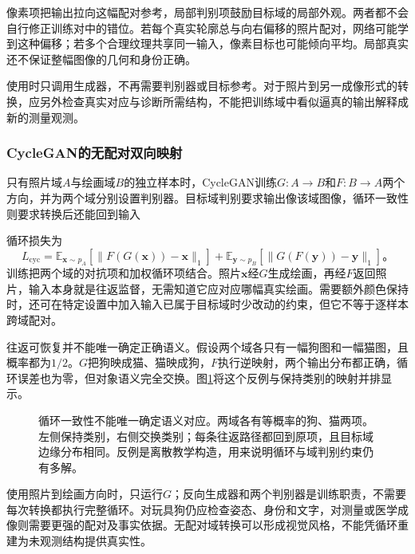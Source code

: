 像素项把输出拉向这幅配对参考，局部判别项鼓励目标域的局部外观。两者都不会自行修正训练对中的错位。若每个真实轮廓总与向右偏移的照片配对，网络可能学到这种偏移；若多个合理纹理共享同一输入，像素目标也可能倾向平均。局部真实还不保证整幅图像的几何和身份正确。

使用时只调用生成器，不再需要判别器或目标参考。对于照片到另一成像形式的转换，应另外检查真实对应与诊断所需结构，不能把训练域中看似逼真的输出解释成新的测量观测。

\subsubsection{CycleGAN的无配对双向映射}
\label{sec:vision-generation-cyclegan}

只有照片域$A$与绘画域$B$的独立样本时，CycleGAN训练$G:A\to B$和$F:B\to A$两个方向，并为两个域分别设置判别器。目标域判别要求输出像该域图像，循环一致性则要求转换后还能回到输入

循环损失为
\begin{equation}
 L_{\mathrm{cyc}}=
 \mathbb{E}_{\bm{x}\sim p_A}
 [\lVert F(G(\bm{x}))-\bm{x}\rVert_1]
 +
 \mathbb{E}_{\bm{y}\sim p_B}
 [\lVert G(F(\bm{y}))-\bm{y}\rVert_1]\text{。}
 \label{eq:vision-cycle-consistency}
\end{equation}
训练把两个域的对抗项和加权循环项结合。照片$\bm{x}$经$G$生成绘画，再经$F$返回照片，输入本身就是往返监督，无需知道它应对应哪幅真实绘画。需要额外颜色保持时，还可在特定设置中加入输入已属于目标域时少改动的约束，但它不等于逐样本跨域配对。

往返可恢复并不能唯一确定正确语义。假设两个域各只有一幅狗图和一幅猫图，且概率都为$1/2$。$G$把狗映成猫、猫映成狗，$F$执行逆映射，两个输出分布都正确，循环误差也为零，但对象语义完全交换。图\ref{fig:vision-cycle-ambiguity}将这个反例与保持类别的映射并排显示。

\begin{figure}[htbp]
 \centering
 
 \caption{循环一致性不能唯一确定语义对应。两域各有等概率的狗、猫两项。左侧保持类别，右侧交换类别；每条往返路径都回到原项，且目标域边缘分布相同。反例是离散教学构造，用来说明循环与域判别约束仍有多解。}
 \label{fig:vision-cycle-ambiguity}
\end{figure}

使用照片到绘画方向时，只运行$G$；反向生成器和两个判别器是训练职责，不需要每次转换都执行完整循环。对玩具狗仍应检查姿态、身份和文字，对测量或医学成像则需要更强的配对及事实依据。无配对域转换可以形成视觉风格，不能凭循环重建为未观测结构提供真实性。

